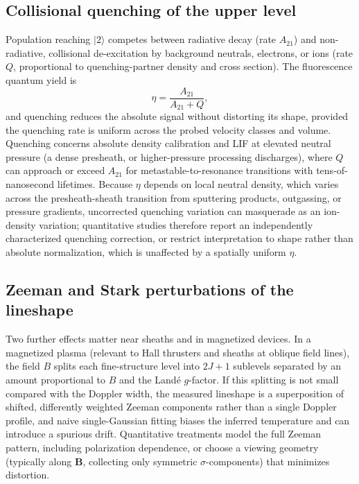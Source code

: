 \subsection{Collisional quenching of the upper level}

Population reaching $\lvert 2 \rangle$ competes between radiative decay (rate $A_{21}$) and non-radiative, collisional de-excitation by background neutrals, electrons, or ions (rate $Q$, proportional to quenching-partner density and cross section). The fluorescence quantum yield is
\begin{equation}
\eta = \frac{A_{21}}{A_{21}+Q},
\label{eq:lif-quenching}
\end{equation}
and quenching reduces the absolute signal without distorting its shape, provided the quenching rate is uniform across the probed velocity classes and volume. Quenching concerns absolute density calibration and LIF at elevated neutral pressure (a dense presheath, or higher-pressure processing discharges), where $Q$ can approach or exceed $A_{21}$ for metastable-to-resonance transitions with tens-of-nanosecond lifetimes. Because $\eta$ depends on local neutral density, which varies across the presheath-sheath transition from sputtering products, outgassing, or pressure gradients, uncorrected quenching variation can masquerade as an ion-density variation; quantitative studies therefore report an independently characterized quenching correction, or restrict interpretation to shape rather than absolute normalization, which is unaffected by a spatially uniform $\eta$.

\subsection{Zeeman and Stark perturbations of the lineshape}

Two further effects matter near sheaths and in magnetized devices. In a magnetized plasma (relevant to Hall thrusters and sheaths at oblique field lines), the field $B$ splits each fine-structure level into $2J+1$ sublevels separated by an amount proportional to $B$ and the Land\'e $g$-factor. If this splitting is not small compared with the Doppler width, the measured lineshape is a superposition of shifted, differently weighted Zeeman components rather than a single Doppler profile, and naive single-Gaussian fitting biases the inferred temperature and can introduce a spurious drift. Quantitative treatments model the full Zeeman pattern, including polarization dependence, or choose a viewing geometry (typically along $\mathbf{B}$, collecting only symmetric $\sigma$-components) that minimizes distortion.

